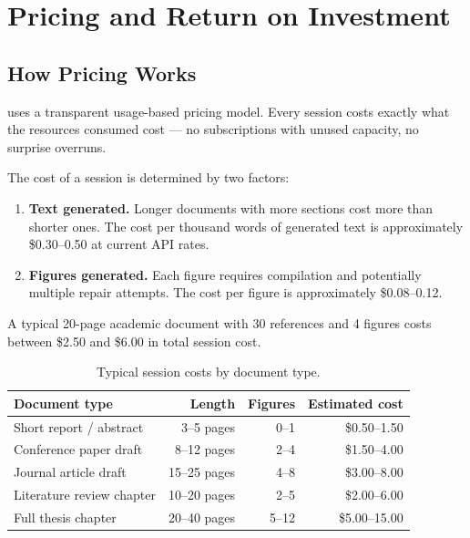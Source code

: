 \section{Pricing and Return on Investment}
\label{sec:pricing}

\subsection{How Pricing Works}

\sys{} uses a transparent usage-based pricing model.
Every session costs exactly what the resources consumed cost — no subscriptions
with unused capacity, no surprise overruns.

The cost of a session is determined by two factors:

\begin{enumerate}
  \item \textbf{Text generated.} Longer documents with more sections cost more
        than shorter ones.
        The cost per thousand words of generated text is approximately \$0.30--0.50
        at current API rates.
  \item \textbf{Figures generated.} Each figure requires compilation and potentially
        multiple repair attempts.
        The cost per figure is approximately \$0.08--0.12.
\end{enumerate}

A typical 20-page academic document with 30 references and 4 figures costs
between \$2.50 and \$6.00 in total session cost.

\begin{table}[h!]
\centering
\caption{Typical session costs by document type.}
\label{tab:pricing}
\begin{tabular}{lrrr}
\toprule
Document type & Length & Figures & Estimated cost \\
\midrule
Short report / abstract     & 3--5 pages  & 0--1 & \$0.50--1.50 \\
Conference paper draft       & 8--12 pages & 2--4 & \$1.50--4.00 \\
Journal article draft        & 15--25 pages & 4--8 & \$3.00--8.00 \\
Literature review chapter    & 10--20 pages & 2--5 & \$2.00--6.00 \\
Full thesis chapter          & 20--40 pages & 5--12 & \$5.00--15.00 \\
\bottomrule
\end{tabular}
\end{table}

